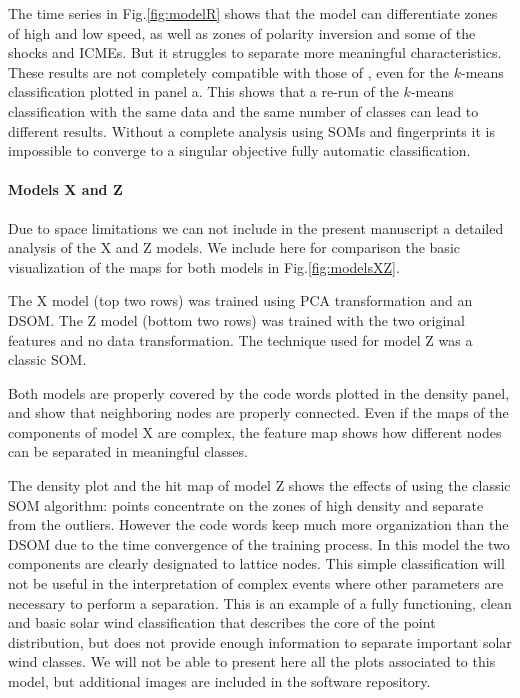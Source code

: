 The time series in Fig.\ref{fig:modelR} shows that the model can differentiate zones of high and low speed, as well as zones of polarity inversion and some of the shocks and ICMEs. But it struggles to separate more meaningful characteristics. These results are not completely compatible with those of \citep{Roberts2020}, even for the $k$-means classification plotted in panel a. This shows that a re-run of the $k$-means classification with the same data and the same number of classes can lead to different results. Without a complete analysis using SOMs and fingerprints it is impossible to converge to a singular objective fully automatic classification.

\paragraph{Models X and Z}
Due to space limitations we can not include in the present manuscript a detailed analysis of the X and Z models. We include here for comparison the basic visualization of the maps for both models in Fig.\ref{fig:modelsXZ}.

The X model (top two rows) was trained using PCA transformation and an DSOM. The Z model (bottom two rows) was trained with the two original features and no data transformation. The technique used for model Z was a classic SOM.

Both models are properly covered by the code words plotted in the density panel, and show that neighboring nodes are properly connected. Even if the maps of the components of model X are complex, the feature map shows how different nodes can be separated in meaningful classes.

The density plot and the hit map of model Z shows the effects of using the classic SOM algorithm: points concentrate on the zones of high density and separate from the outliers. However the code words keep much more organization than the DSOM due to the time convergence of the training process. In this model the two components are clearly designated to lattice nodes. This simple classification will not be useful in the interpretation of complex events where other parameters are necessary to perform a separation. This is an example of a fully functioning, clean and basic solar wind classification that describes the core of the point distribution, but does not provide enough information to separate important solar wind classes. We will not be able to present here all the plots associated to this model, but additional images are included in the software repository.
